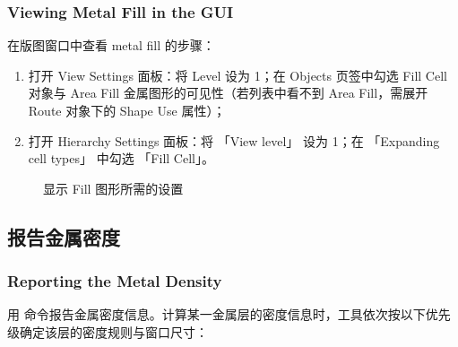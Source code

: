 \subsubsection*{Viewing Metal Fill in the GUI}

在版图窗口中查看 metal fill 的步骤：
\begin{enumerate}
  \item 打开 View Settings 面板：将 Level 设为 1；在 Objects 页签中勾选 Fill Cell 对象与 Area Fill 金属图形的可见性（若列表中看不到 Area Fill，需展开 Route 对象下的 Shape Use 属性）；
  \item 打开 Hierarchy Settings 面板：将 「View level」 设为 1；在 「Expanding cell types」 中勾选 「Fill Cell」。
\end{enumerate}

\begin{figure}[htbp]
\centering
{}
\caption{显示 Fill 图形所需的设置}
\label{fig:fill-display-settings}
\end{figure}

\subsection{报告金属密度}
\subsubsection*{Reporting the Metal Density}

用  命令报告金属密度信息。计算某一金属层的密度信息时，工具依次按以下优先级确定该层的密度规则与窗口尺寸：

